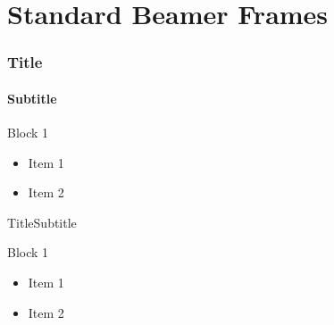 \documentclass{beamer}
\begin{document}
\section*{Standard Beamer Frames}

    \begin{frame}
        \frametitle{Title}
        \framesubtitle{Subtitle}
        \begin{block}{Block 1}
            \begin{itemize}
                \item Item 1
                \item Item 2
            \end{itemize}
        \end{block}
    \end{frame}

    \begin{frame}{Title}{Subtitle}
        \begin{block}{Block 1}
            \begin{itemize}
                \item Item 1
                \item Item 2
            \end{itemize}
        \end{block}
    \end{frame}
\end{document}
